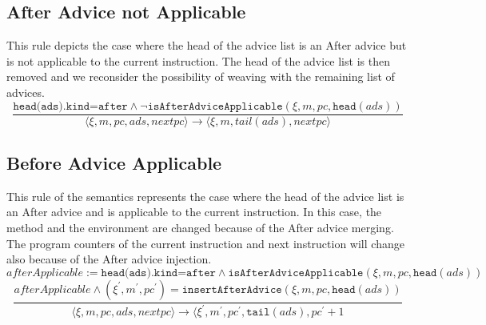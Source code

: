 \subsection{After Advice not Applicable}
This rule depicts the case where the head of the advice list is an After
advice but is not applicable to the current instruction. The head of the advice list
is then removed and we reconsider the possibility of weaving with the remaining
list of advices.
$$\frac{\texttt{head(ads).kind=after}\wedge \neg \texttt{isAfterAdviceApplicable}(\xi,m,pc,\texttt{head}(ads))}
{\langle\xi,m,pc,ads,nextpc\rangle\longrightarrow\langle\xi,m,tail(ads),nextpc\rangle}$$

\subsection{Before Advice Applicable}
This rule of the semantics represents the case where the head
of the advice list is an After advice and is applicable to the current instruction.
In this case, the method and the environment are changed because of the After
advice merging. The program counters of the current instruction and next instruction will change also because of the After advice injection.\\
 $afterApplicable:=\texttt{head(ads).kind=after}\wedge \texttt{isAfterAdviceApplicable}(\xi,m,pc,\texttt{head}(ads))$
$$\frac{afterApplicable\wedge (\xi^\prime,m^\prime,pc^\prime)=\texttt{insertAfterAdvice}(\xi,m,pc,\texttt{head}(ads))}
{\langle\xi,m,pc,ads,nextpc\rangle\longrightarrow\langle\xi^\prime,m^\prime,pc^\prime,\texttt{tail}(ads),pc^\prime+1}$$

